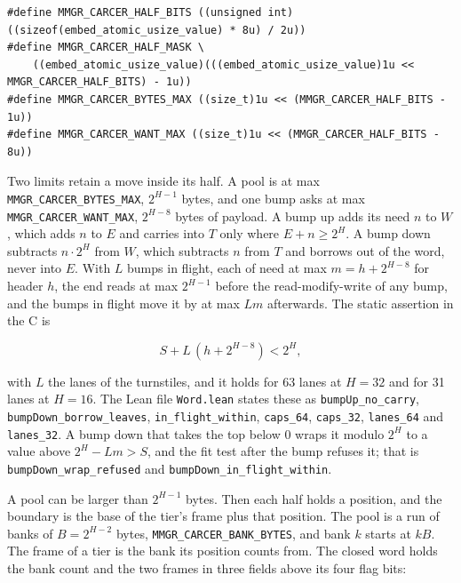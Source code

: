 \begin{Verbatim}
#define MMGR_CARCER_HALF_BITS ((unsigned int)((sizeof(embed_atomic_usize_value) * 8u) / 2u))
#define MMGR_CARCER_HALF_MASK \
    ((embed_atomic_usize_value)(((embed_atomic_usize_value)1u << MMGR_CARCER_HALF_BITS) - 1u))
#define MMGR_CARCER_BYTES_MAX ((size_t)1u << (MMGR_CARCER_HALF_BITS - 1u))
#define MMGR_CARCER_WANT_MAX ((size_t)1u << (MMGR_CARCER_HALF_BITS - 8u))
\end{Verbatim}

Two limits retain a move inside its half. A pool is at max \texttt{MMGR\_\allowbreak{}CARCER\_\allowbreak{}BYTES\_\allowbreak{}MAX}, \(2^{H-1}\) bytes, and one bump asks at max \texttt{MMGR\_\allowbreak{}CARCER\_\allowbreak{}WANT\_\allowbreak{}MAX}, \(2^{H-8}\) bytes of payload. A bump up adds its need \(n\) to \(W\), which adds \(n\) to \(E\) and carries into \(T\) only where \(E + n \ge 2^H\). A bump down subtracts \(n \cdot 2^H\) from \(W\), which subtracts \(n\) from \(T\) and borrows out of the word, never into \(E\). With \(L\) bumps in flight, each of need at max \(m = h + 2^{H-8}\) for header \(h\), the end reads at max \(2^{H-1}\) before the read-modify-write of any bump, and the bumps in flight move it by at max \(L m\) afterwards. The static assertion in the C is

\[
S + L\,(h + 2^{H-8}) < 2^{H},
\]

with \(L\) the lanes of the turnstiles, and it holds for 63 lanes at \(H = 32\) and for 31 lanes at \(H = 16\). The Lean file \texttt{Word.\allowbreak{}lean} states these as \texttt{bump\allowbreak{}Up\_\allowbreak{}no\_\allowbreak{}carry}, \texttt{bump\allowbreak{}Down\_\allowbreak{}borrow\_\allowbreak{}leaves}, \texttt{in\_\allowbreak{}flight\_\allowbreak{}within}, \texttt{caps\_\allowbreak{}64}, \texttt{caps\_\allowbreak{}32}, \texttt{lanes\_\allowbreak{}64} and \texttt{lanes\_\allowbreak{}32}. A bump down that takes the top below 0 wraps it modulo \(2^H\) to a value above \(2^H - L m > S\), and the fit test after the bump refuses it; that is \texttt{bump\allowbreak{}Down\_\allowbreak{}wrap\_\allowbreak{}refused} and \texttt{bump\allowbreak{}Down\_\allowbreak{}in\_\allowbreak{}flight\_\allowbreak{}within}.

A pool can be larger than \(2^{H-1}\) bytes. Then each half holds a position, and the boundary is the base of the tier's frame plus that position. The pool is a run of banks of \(B = 2^{H-2}\) bytes, \texttt{MMGR\_\allowbreak{}CARCER\_\allowbreak{}BANK\_\allowbreak{}BYTES}, and bank \(k\) starts at \(k B\). The frame of a tier is the bank its position counts from. The closed word holds the bank count and the two frames in three fields above its four flag bits:

